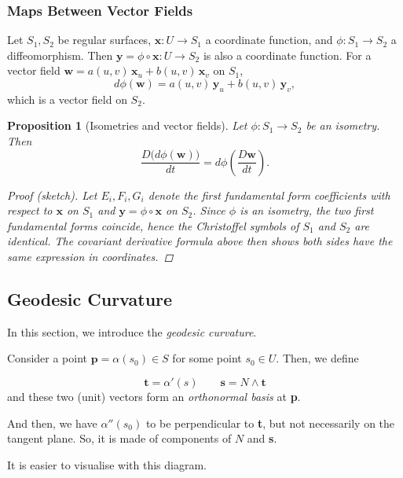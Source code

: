 \documentclass[10pt, a4paper]{article}
\theoremstyle{plain}
\newtheorem{proposition}[theorem]{Proposition}
\theoremstyle{definition}
\theoremstyle{remark}
\begin{document}
\subsubsection*{Maps Between Vector Fields}

Let $S_1, S_2$ be regular surfaces, $\mathbf{x}\colon U \to S_1$ a coordinate function, and
$\phi\colon S_1 \to S_2$ a diffeomorphism. Then $\mathbf{y} = \phi \circ \mathbf{x}\colon U \to S_2$
is also a coordinate function. For a vector field
$\mathbf{w} = a(u,v)\,\mathbf{x}_u + b(u,v)\,\mathbf{x}_v$ on $S_1$,
\[
  d\phi(\mathbf{w}) = a(u,v)\,\mathbf{y}_u + b(u,v)\,\mathbf{y}_v,
\]
which is a vector field on $S_2$.

\begin{proposition}[Isometries and vector fields]\label{prop:isometries-vec-fields}
  Let $\phi\colon S_1 \to S_2$ be an isometry. Then
  \[
    \frac{D\bigl(d\phi(\mathbf{w})\bigr)}{dt} = d\phi\!\left(\frac{D\mathbf{w}}{dt}\right).
  \]

  \begin{proof}[Proof (sketch)]
    Let $E_i, F_i, G_i$ denote the first fundamental form coefficients with respect to
    $\mathbf{x}$ on $S_1$ and $\mathbf{y} = \phi \circ \mathbf{x}$ on $S_2$. Since $\phi$ is
    an isometry, the two first fundamental forms coincide, hence the Christoffel symbols of
    $S_1$ and $S_2$ are identical. The covariant derivative formula above then shows both
    sides have the same expression in coordinates.
  \end{proof}
\end{proposition}


\pagebreak
\subsection{Geodesic Curvature}

In this section, we introduce the \textit{geodesic curvature}. 

\medskip \noindent Consider a point $\textbf{p} = \alpha(s_0) \in S$ for some point $s_0 \in U$. Then, we define 

$$\textbf{t} = \alpha'(s) \qquad \textbf{s} = N \wedge \textbf{t}$$ and these two (unit) vectors form an \textit{orthonormal basis} at \textbf{p}.

And then, we have $\alpha''(s_0)$ to be perpendicular to \textbf{t}, but not necessarily on the tangent plane. So, it is made of components of $N$ and \textbf{s}. 

It is easier to visualise with this diagram.
\end{document}
